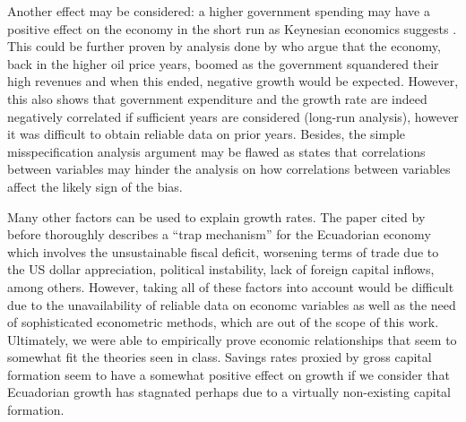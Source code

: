 \documentclass[12pt,twoside,a4paper]{article}
\numberwithin{equation}{section}
\begin{document}
Another effect may be considered: a higher government spending may have a positive effect on the economy in the short run as Keynesian economics suggests \parencite{Abel.2014}. This could be further proven by analysis done by \textcite{LaTorre.2017} who argue that the economy, back in the higher oil price years, boomed as the government squandered their high revenues and when this ended, negative growth would be expected. However, this also shows that government expenditure and the growth rate are indeed negatively correlated if sufficient years are considered (long-run analysis), however it was difficult to obtain reliable data on prior years. Besides, the simple misspecification analysis argument may be flawed as \textcite{Woolridge.2016} states that correlations between variables may hinder the analysis on how correlations between variables affect the likely sign of the bias.

Many other factors can be used to explain growth rates. The paper cited by \textcite{LaTorre.2017} before thoroughly describes a “trap mechanism” for the Ecuadorian economy which involves the unsustainable fiscal deficit, worsening terms of trade due to the US dollar appreciation, political instability, lack of foreign capital inflows, among others. However, taking all of these factors into account would be difficult due to the unavailability of reliable data on economc variables as well as the need of sophisticated econometric methods, which are out of the scope of this work. Ultimately, we were able to empirically prove economic relationships that seem to somewhat fit the theories seen in class. Savings rates proxied by gross capital formation seem to have a somewhat positive effect on growth if we consider that Ecuadorian growth has stagnated perhaps due to a virtually non-existing capital formation. 

\printbibliography
\end{document}
